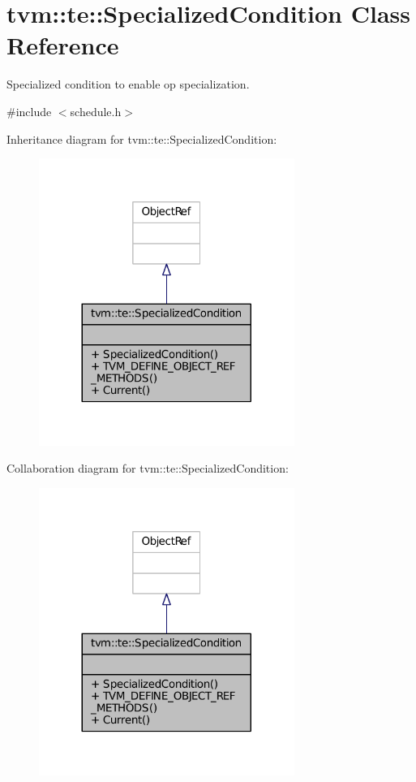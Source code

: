 \hypertarget{classtvm_1_1te_1_1SpecializedCondition}{}\section{tvm\+:\+:te\+:\+:Specialized\+Condition Class Reference}
\label{classtvm_1_1te_1_1SpecializedCondition}


Specialized condition to enable op specialization.  




{\ttfamily \#include $<$schedule.\+h$>$}



Inheritance diagram for tvm\+:\+:te\+:\+:Specialized\+Condition\+:
\nopagebreak
\begin{figure}[H]
\begin{center}
\leavevmode
\includegraphics[width=236pt]{classtvm_1_1te_1_1SpecializedCondition__inherit__graph}
\end{center}
\end{figure}


Collaboration diagram for tvm\+:\+:te\+:\+:Specialized\+Condition\+:
\nopagebreak
\begin{figure}[H]
\begin{center}
\leavevmode
\includegraphics[width=236pt]{classtvm_1_1te_1_1SpecializedCondition__coll__graph}
\end{center}
\end{figure}
